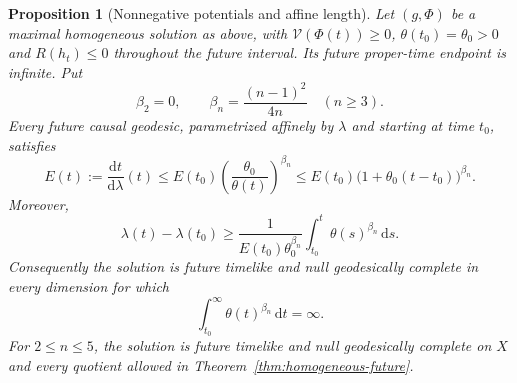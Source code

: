 \documentclass[10pt,a4paper]{article}
\numberwithin{equation}{section}
\newtheorem{proposition}[theorem]{Proposition}
\theoremstyle{definition}
\theoremstyle{remark}
\newcommand{\dd}{\mathrm d}
\begin{document}
\begin{proposition}[Nonnegative potentials and affine length]
\label{prop:nonnegative-future-completeness}
Let $(g,\Phi)$ be a maximal homogeneous solution as above, with
$\mathcal V(\Phi(t))\ge0$, $\theta(t_0)=\theta_0>0$ and $R(h_t)\le0$
throughout the future interval.  Its future proper-time endpoint is
infinite.  Put
\[
 \beta_2=0,\qquad \beta_n=\frac{(n-1)^2}{4n}\quad(n\ge3).
\]
Every future causal geodesic,
parametrized affinely by $\lambda$ and starting at time $t_0$,
satisfies
\begin{equation}
 E(t):=\frac{\dd t}{\dd\lambda}(t)
 \le E(t_0)\left(\frac{\theta_0}{\theta(t)}\right)^{\beta_n}
 \le E(t_0)\bigl(1+\theta_0(t-t_0)\bigr)^{\beta_n}.
 \label{eq:future-geodesic-energy}
\end{equation}
Moreover,
\begin{equation}
 \lambda(t)-\lambda(t_0)\ge
 \frac{1}{E(t_0)\theta_0^{\beta_n}}
 \int_{t_0}^{t}\theta(s)^{\beta_n}\,\dd s.
 \label{eq:future-affine-integral}
\end{equation}
Consequently the solution is future timelike and null geodesically
complete in every dimension for which
\begin{equation}
 \int_{t_0}^{\infty}\theta(t)^{\beta_n}\,\dd t=\infty.
 \label{eq:theta-affine-criterion}
\end{equation}
For $2\le n\le5$, the solution is future timelike and null
geodesically complete on $X$ and every quotient allowed in
Theorem~\ref{thm:homogeneous-future}.
\end{proposition}
\end{document}
